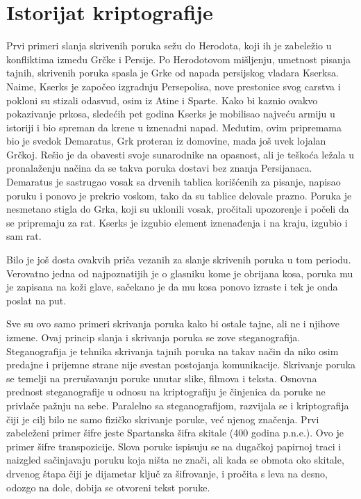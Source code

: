 \documentclass[a4paper]{article}
\begin{document}
\section{Istorijat kriptografije}
\label{sec:istorijat_kriptografije}
Prvi primeri slanja skrivenih poruka sežu do Herodota, koji ih je zabeležio u konfliktima između Grčke i Persije. Po Herodotovom mišljenju, umetnost pisanja tajnih, skrivenih poruka spasla je Grke od napada persijskog vladara Kserksa. Naime, Kserks je započeo izgradnju Persepolisa, nove prestonice svog carstva i pokloni su stizali odasvud, osim iz Atine i Sparte. Kako bi kaznio ovakvo pokazivanje prkosa, sledećih pet godina Kserks je mobilisao najveću armiju u istoriji i bio spreman da krene u iznenadni napad. Međutim, ovim pripremama bio je svedok Demaratus, Grk proteran iz domovine, mada još uvek lojalan Grčkoj. Rešio je da obavesti svoje sunarodnike na opasnost, ali je teškoća ležala u pronalaženju načina da se takva poruka dostavi bez znanja Persijanaca. Demaratus je sastrugao vosak sa drvenih tablica korišćenih za pisanje, napisao poruku i ponovo je prekrio voskom, tako da su tablice delovale prazno. Poruka je nesmetano stigla do Grka, koji su uklonili vosak, pročitali upozorenje i počeli da se pripremaju za rat. Kserks je izgubio element iznenađenja i na kraju, izgubio i sam rat.

Bilo je još dosta ovakvih priča vezanih za slanje skrivenih poruka u tom periodu. Verovatno jedna od najpoznatijih je o glasniku kome je obrijana kosa, poruka mu je zapisana na koži glave, sačekano je da mu kosa ponovo izraste i tek je onda poslat na put.

Sve su ovo samo primeri skrivanja poruka kako bi ostale tajne, ali ne i njihove izmene. Ovaj princip slanja i skrivanja poruka se zove steganografija. Steganografija je tehnika skrivanja tajnih poruka na takav način da niko osim predajne i prijemne strane nije svestan postojanja komunikacije. Skrivanje poruka se temelji na prerušavanju poruke unutar slike, filmova i teksta. Osnovna prednost steganografije u odnosu na kriptografiju je činjenica da poruke ne privlače pažnju na sebe. 
Paralelno sa steganografijom, razvijala se i kriptografija čiji je cilj bilo ne samo
fizičko skrivanje poruke, već njenog značenja. Prvi zabeleženi primer šifre jeste Spartanska šifra skitale (400 godina p.n.e.). Ovo je primer šifre transpozicije. Slova poruke ispisuju se na dugačkoj papirnoj traci i naizgled sačinjavaju poruku koja ništa ne znači, ali kada se obmota oko skitale, drvenog štapa čiji je dijametar ključ za šifrovanje, i pročita s leva na desno, odozgo na dole, dobija se otvoreni tekst poruke.
\end{document}
